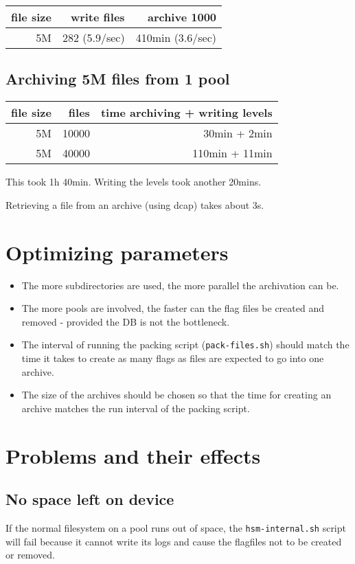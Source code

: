 \documentclass[a4paper,8pt]{scrartcl}
\begin{document}
\begin{tabular}{|r||r||r|}
  \hline
  file size & write files  & archive 1000 \\
  \hline
  5M        & 282 (5.9/sec) & 410min (3.6/sec) \\
  \hline
\end{tabular}

\subsection{Archiving 5M files from 1 pool}

\begin{tabular}{|r|r||r|}
  \hline
  file size & files  & time archiving + writing levels \\
  \hline
  5M        & 10000 & 30min + 2min \\
  \hline
  5M        & 40000 & 110min + 11min \\
  \hline
\end{tabular}
This took 1h 40min. Writing the levels took another 20mins.

Retrieving a file from an archive (using dcap) takes about 3s.

\section{Optimizing parameters}
\begin{itemize}
  \item The more subdirectories are used, the more parallel the archivation can
    be.
  \item The more pools are involved, the faster can the flag files be created
    and removed - provided the DB is not the bottleneck.
  \item The interval of running the packing script (\texttt{pack-files.sh})
    should match the time it takes to create as many flags as files are
    expected to go into one archive.
  \item The size of the archives should be chosen so that the time for creating
    an archive matches the run interval of the packing script.
\end{itemize}


\section{Problems and their effects}

\subsection{No space left on device}
If the normal filesystem on a pool runs out of space, the
\texttt{hsm-internal.sh} script will fail because it cannot write its logs and
cause the flagfiles not to be created or removed.
\end{document}
